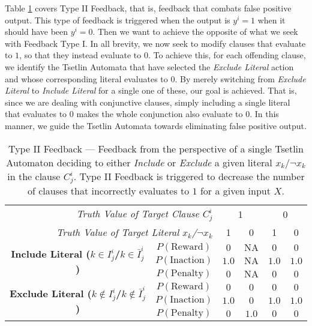 \documentclass[11pt,a4paper]{article}
\newcommand{\True}{\mbox{1}}
\newcommand{\False}{\mbox{0}}
\begin{document}
Table \ref{table:type_ii_feedback} covers Type II Feedback, that is, feedback that combats false positive output. This type of feedback is triggered when the output is $y^i=\True$ when it should have been $y^i=\False$. Then we want to achieve the opposite of what we seek with Feedback Type I. In all brevity, we now seek to modify clauses that evaluate to $\True$, so that they instead evaluate to $\False$. To achieve this, for each offending clause, we identify the Tsetlin Automata that have selected the \emph{Exclude Literal} action and whose corresponding literal evaluates to $\False$. By merely switching from \emph{Exclude Literal} to \emph{Include Literal} for a single one of these, our goal is achieved. That is, since we are dealing with conjunctive clauses, simply including a single literal that evaluates to $\False$ makes the whole conjunction also evaluate to $\False$. In this manner, we guide the  Tsetlin Automata towards eliminating false positive output.
\begin{table}[bh!]
\centering
\begin{tabular}{c|ccccc}
\multicolumn{2}{r|}{\it Truth Value of Target Clause $C^i_j$}&\multicolumn{2}{c}{\True}&\multicolumn{2}{c}{\False}\\  
\multicolumn{2}{r|}{\it Truth Value of Target Literal $x_k$/$\lnot x_k$}&{\True}&{\False}&{\True}&{\False}\\
 \hline
 \hline
    \multirow{3}{*}{\bf Include Literal ($k \in I_j^i$/$k \in \bar I_j^i$)}&\multicolumn{1}{c|}{$P(\mathrm{Reward})$}&$0$&$\mathrm{NA}$&$0$&$0$\\
    &\multicolumn{1}{c|}{$P(\mathrm{Inaction})$}&$1.0$&$\mathrm{NA}$&$1.0$&$1.0$\\
  &\multicolumn{1}{c|}{$P(\mathrm{Penalty})$}&$0$&$\mathrm{NA}$&$0$&$0$\\
  \hline
  \multirow{3}{*}{\bf Exclude Literal ($k \notin I_j^i$/$k \notin \bar I_j^i$)}&\multicolumn{1}{c|}{$P(\mathrm{Reward})$}&$0$&$0$&$0$&$0$\\
  &\multicolumn{1}{c|}{$P(\mathrm{Inaction})$}&$1.0$&$0$&$1.0$ &$1.0$\\
  &\multicolumn{1}{c|}{$P(\mathrm{Penalty})$}&$0$&$1.0$&$0$&$0$\\
  \hline
\end{tabular}
\caption{Type II Feedback --- Feedback from the perspective of a single Tsetlin Automaton deciding to either \emph{Include} or \emph{Exclude} a given literal $x_k$/$\lnot x_k$ in the clause $C^i_j$. Type II Feedback is triggered to decrease the number of clauses that incorrectly evaluates to $\True$ for a given input $X$.}
\label{table:type_ii_feedback}
\end{table}
\end{document}

